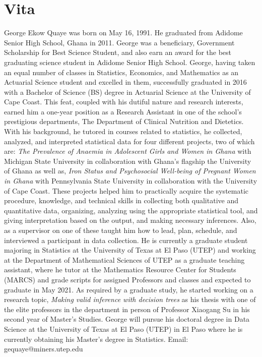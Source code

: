 
\chapter*{Vita}

George Ekow Quaye was born on May 16, 1991. He graduated from Adidome Senior High School, Ghana in 2011. George was a beneficiary, Government Scholarship for Best Science Student, and also earn an award for the best graduating science student in Adidome Senior High School. George, having taken an equal number of classes in Statistics, Economics, and Mathematics as an Actuarial Science student and excelled in them, successfully graduated in 2016 with a Bachelor of Science (BS) degree in Actuarial Science at the University of Cape Coast. This feat, coupled with his dutiful nature and research interests, earned him a one-year position as a Research Assistant in one of the school’s prestigious departments, The Department of Clinical Nutrition and Dietetics. With his background, he tutored in courses related to statistics, he collected, analyzed, and interpreted statistical data for four different projects, two of which are: \textit{The Prevalence of Anaemia in Adolescent Girls and Women in Ghana} with Michigan State University in collaboration with Ghana’s flagship the University of Ghana as well as, \textit{Iron Status and Psychosocial Well-being of Pregnant Women in Ghana} with Pennsylvania State University in collaboration with the University of Cape Coast. These projects helped him to practically acquire the systematic procedure, knowledge, and technical skills in collecting both qualitative and quantitative data, organizing, analyzing using the appropriate statistical tool, and giving interpretation based on the output, and making necessary inferences. Also, as a supervisor on one of these taught him how to lead, plan, schedule, and interviewed a participant in data collection. He is currently a graduate student majoring in Statistics at the University of Texas at El Paso (UTEP) and working at the Department of Mathematical Sciences of UTEP as a graduate teaching assistant, where he tutor at the Mathematics Resource Center for Students (MARCS) and grade scripts for assigned Professors and classes and expected to graduate in May 2021. As required by a graduate study,  he started working on a research topic, \textit{Making valid inference with decision trees} as his thesis with one of the elite professors in the department in person of Professor Xiaogang Su in his second year of Master's Studies. George will pursue his doctoral degree in Data Science at the  University of Texas at El Paso (UTEP) in El Paso where he is currently obtaining his Master's degree in Statistics.\newline
Email: gequaye@miners.utep.edu









